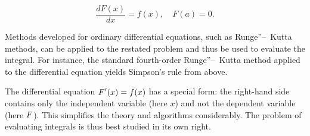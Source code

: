 \documentclass[a4paper]{article}
\begin{document}
\begin{equation*}
	{\frac {dF(x)}{dx}}=f(x),\quad F(a)=0.
\end{equation*}

Methods developed for ordinary differential equations, such as Runge''--~Kutta methods, can be applied to the restated problem and thus be used to evaluate the integral. For instance, the standard fourth-order Runge''--~Kutta method applied to the differential equation yields Simpson's rule from above.

The differential equation ${\displaystyle F'(x)=f(x)}$ has a special form: the right-hand side contains only the independent variable (here $x$) and not the dependent variable (here ${\displaystyle F}$). This simplifies the theory and algorithms considerably. The problem of evaluating integrals is thus best studied in its own right.


\nocite{barnhill1976philip}
\nocite{forsythe1977computer}
\nocite{press2007numerical}
\nocite{stoer2013introduction}
\nocite{boyer2011history}
\nocite{eves1990introduction}

\end{document}
